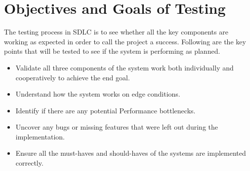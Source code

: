\section{Objectives and Goals of Testing}

The testing process in SDLC is to see whether all the key components are working as expected in order to call the project a success. Following are the key points that will be tested to see if the system is performing as planned.


\begin{itemize}[noitemsep,nolistsep]
    \item Validate all three components of the system work both individually and cooperatively to achieve the end goal.
    \item Understand how the system works on edge conditions.
    \item Identify if there are any potential Performance bottlenecks.
    \item Uncover any bugs or missing features that were left out during the implementation.
    \item Ensure all the must-haves and should-haves of the systems are implemented correctly.
\end{itemize}